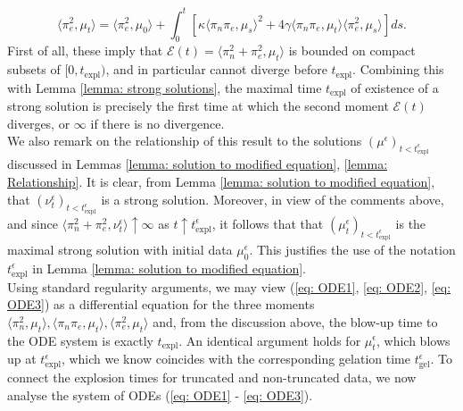 \begin{equation} \label{eq: ODE3}
    \langle \pi_e^2, \mu_t\rangle =
    \langle \pi_e^2, \mu_0\rangle + \int_0^t \left[\kappa\langle \pi_n\pi_e, \mu_s\rangle^2+4\gamma\langle \pi_n\pi_e, \mu_t\rangle\langle\pi_e^2, \mu_s \rangle \right] ds.
\end{equation} First of all, these imply that $\mathcal{E}(t)=\langle \pi_n^2+\pi_e^2, \mu_t\rangle$ is bounded on compact subsets of $[0, t_\mathrm{expl})$, and in particular cannot diverge before $t_\mathrm{expl}$. Combining this with Lemma \ref{lemma: strong solutions}, the maximal time $t_\mathrm{expl}$ of existence of a strong solution is precisely the first time at which the second moment $\mathcal{E}(t)$ diverges, or $\infty$ if there is no divergence. \medskip \\ We also remark on the relationship of this result to the solutions $(\mu^\epsilon)_{t<t_\mathrm{expl}^\epsilon}$ discussed in Lemmas \ref{lemma: solution to modified equation}, \ref{lemma: Relationship}. It is clear, from Lemma \ref{lemma: solution to modified equation}, that $(\nu^\epsilon_t)_{t<t_\mathrm{expl}^\epsilon}$ is a strong solution. Moreover, in view of the comments above, and since $\langle \pi_n^2+\pi_e^2, \nu^\epsilon_t\rangle \uparrow \infty$ as $t\uparrow t_\mathrm{expl}^\epsilon$, it follows that that $(\mu^{\epsilon}_t)_{t<t_\mathrm{expl}^\epsilon}$ is the maximal strong solution with initial data $\mu^\epsilon_0.$ This justifies the use of the notation $t^\epsilon_\mathrm{expl}$ in Lemma \ref{lemma: solution to modified equation}.  \medskip \\  Using standard regularity arguments, we may view (\ref{eq: ODE1}, \ref{eq: ODE2}, \ref{eq: ODE3}) as a differential equation for the three moments $\langle \pi_n^2, \mu_t\rangle, \langle \pi_n \pi_e, \mu_t\rangle, \langle \pi_e^2, \mu_t\rangle$ and, from the discussion above, the blow-up time to the ODE system is exactly $t_\mathrm{expl}$. An identical argument holds for $\mu^\epsilon_t$, which blows up at $t^\epsilon_\mathrm{expl}$, which we know coincides with the corresponding gelation time $t^\epsilon_\mathrm{gel}$. To connect the explosion times for truncated and non-truncated data, we now analyse the system of ODEs (\ref{eq: ODE1} - \ref{eq: ODE3}).
